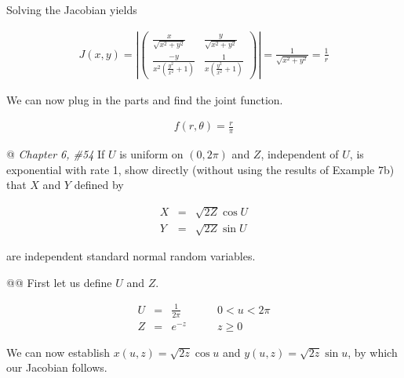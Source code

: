 \documentclass[11pt]{article}\usepackage[]{graphicx}\usepackage[]{xcolor}
\begin{document}
\begin{easylist}[enumerate]
    Solving the Jacobian yields

    \begin{equation}
        \begin{aligned}
            J(x, y) = \left| \begin{pmatrix}
                                 \frac{x}{\sqrt{x^2+y^2}} & \frac{y}{\sqrt{x^2+y^2}}\\
                                 \frac{-y}{x^2 \left(\frac{y^2}{x^2}+1\right)} & \frac{1}{x \left(\frac{y^2}{x^2}+1\right)}
                             \end{pmatrix}
                      \right| = \frac{1}{\sqrt{x^2+y^2}} = \frac{1}{r}
        \end{aligned}
    \end{equation}

    We can now plug in the parts and find the joint function.

    \begin{equation}
        \begin{aligned}
            f(r, \theta) = \frac{r}{\pi}
        \end{aligned}
    \end{equation}

    @ \textit{Chapter 6, \#54} If $U$ is uniform on $(0, 2\pi)$ and $Z$, independent of $U$, is exponential with rate 1,
    show directly (without using the results of Example 7b) that $X$ and $Y$ defined by

    \begin{equation}
        \begin{aligned}
            X &=& \sqrt{2Z}\cos U\\
            Y &=& \sqrt{2Z}\sin U
        \end{aligned}
    \end{equation}

    are independent standard normal random variables.

    @@ First let us define $U$ and $Z$.

    \begin{equation}
        \begin{aligned}
            U &=& \frac{1}{2 \pi} &\qquad 0 < u < 2 \pi\\
            Z &=& e^{-z} &\qquad z \ge 0
        \end{aligned}
    \end{equation}

    We can now establish $x(u, z) = \sqrt{2z}\cos u$ and $y(u, z) = \sqrt{2z}\sin u$, by which our Jacobian follows.


\end{easylist}
\end{document}
